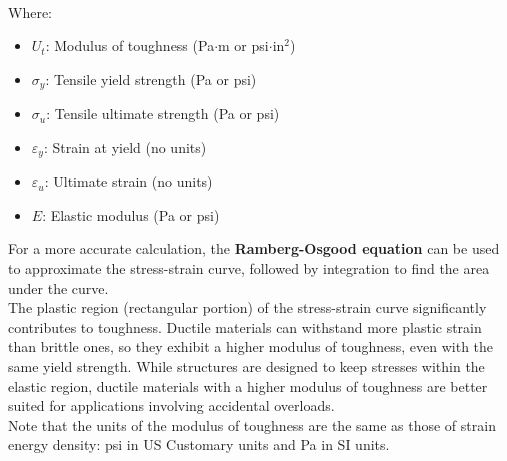 \documentclass{article}
\begin{document}
\begin{center}
\begin{minipage}{0.45\textwidth}
\begin{equation}
\begin{aligned}
            \end{aligned}
        \end{equation}
        Where:
        \begin{itemize}[left=0pt, itemsep=-1mm]
            \item \( U_t \): Modulus of toughness (Pa\(\cdot\)m or psi\(\cdot\)in\(^2\))
            \item $\sigma_y$: Tensile yield strength (Pa or psi)
            \item $\sigma_u$: Tensile ultimate strength (Pa or psi)
            \item $\varepsilon_y$: Strain at yield (no units)
            \item $\varepsilon_u$: Ultimate strain (no units)
            \item $E$: Elastic modulus (Pa or psi)
        \end{itemize}
    \end{minipage}
\end{center}
For a more accurate calculation, the \textbf{Ramberg-Osgood equation} can be used to approximate the stress-strain curve, followed by integration to find the area under the curve.\\[8pt]
The plastic region (rectangular portion) of the stress-strain curve significantly contributes to toughness. Ductile materials can withstand more plastic strain than brittle ones, so they exhibit a higher modulus of toughness, even with the same yield strength. While structures are designed to keep stresses within the elastic region, ductile materials with a higher modulus of toughness are better suited for applications involving accidental overloads.\\[8pt]
Note that the units of the modulus of toughness are the same as those of strain energy density: psi in US Customary units and Pa in SI units.

\newpage
\end{document}
